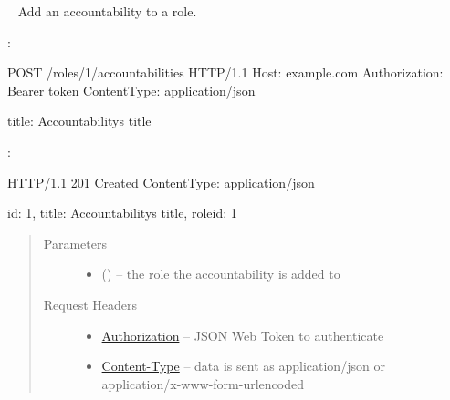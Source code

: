 \documentclass[letterpaper,10pt,english]{sphinxmanual}
\begin{document}
\begin{fulllineitems}
\label{\detokenize{resources/role:post--roles-(role_id)-accountabilities}}~
Add an accountability to a role.

:

\begin{sphinxVerbatim}[commandchars=\\\{\}]
POST /roles/1/accountabilities HTTP/1.1
Host: example.com
Authorization: Bearer \PYGZlt{}token\PYGZgt{}
Content\PYGZhy{}Type: application/json

\PYGZob{}
    \PYGZsq{}title\PYGZsq{}: \PYGZsq{}Accountability\PYGZsq{}s title\PYGZsq{}
\PYGZcb{}
\end{sphinxVerbatim}

:

\begin{sphinxVerbatim}[commandchars=\\\{\}]
HTTP/1.1 201 Created
Content\PYGZhy{}Type: application/json

\PYGZob{}
    \PYGZsq{}id\PYGZsq{}: 1,
    \PYGZsq{}title\PYGZsq{}: \PYGZsq{}Accountability\PYGZsq{}s title\PYGZsq{},
    \PYGZsq{}role\PYGZus{}id\PYGZsq{}: 1
\PYGZcb{}
\end{sphinxVerbatim}
\begin{quote}\begin{description}
\item[{Parameters}] \leavevmode\begin{itemize}
\item {} 
 () -- the role the accountability is added to

\end{itemize}

\item[{Request Headers}] \leavevmode\begin{itemize}
\item {} 
\href{http://tools.ietf.org/html/rfc7235\#section-4.2}{Authorization} -- JSON Web Token to authenticate

\item {} 
\href{http://tools.ietf.org/html/rfc7231\#section-3.1.1.5}{Content-Type} -- data is sent as application/json or
application/x-www-form-urlencoded

\end{itemize}


\end{description}
\end{quote}
\end{fulllineitems}
\end{document}
